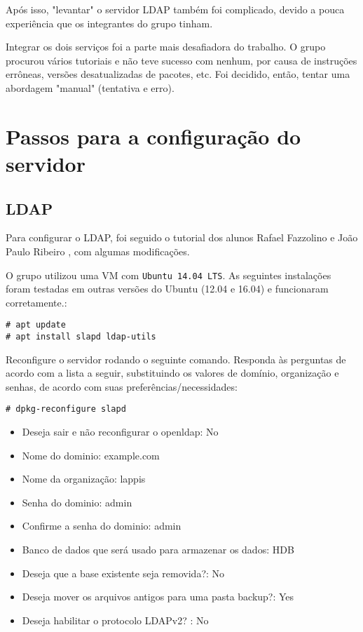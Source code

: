Após isso, "levantar" o servidor LDAP também foi complicado, devido a pouca
experiência que os integrantes do grupo tinham.


Integrar os dois serviços foi a parte mais desafiadora do trabalho. O grupo procurou
vários tutoriais e não teve sucesso com nenhum, por causa de instruções errôneas,
versões desatualizadas de pacotes, etc. Foi decidido, então, tentar uma abordagem
"manual" (tentativa e erro).

\section{Passos para a configuração do servidor}

\subsection{LDAP}
Para configurar o LDAP, foi seguido o tutorial dos alunos Rafael Fazzolino e João Paulo
Ribeiro \cite{wiki}, com algumas modificações.

O grupo utilizou uma VM com \verb|Ubuntu 14.04 LTS|. As seguintes instalações
foram testadas em outras versões do Ubuntu (12.04 e 16.04) e funcionaram corretamente.:
\begin{verbatim}
# apt update
# apt install slapd ldap-utils
\end{verbatim}

Reconfigure o servidor rodando o seguinte comando. Responda às perguntas de acordo
com a lista a seguir, substituindo os valores de domínio, organização e senhas, de
acordo com suas preferências/necessidades:

\begin{verbatim}
# dpkg-reconfigure slapd
\end{verbatim}

\begin{itemize}
    \item Deseja sair e não reconfigurar o openldap: No
    \item Nome do dominio: example.com
    \item Nome da organização: lappis
    \item Senha do dominio: admin
    \item Confirme a senha do dominio: admin
    \item Banco de dados que será usado para armazenar os dados: HDB
    \item Deseja que a base existente seja removida?: No
    \item Deseja mover os arquivos antigos para uma pasta backup?: Yes
    \item Deseja habilitar o protocolo LDAPv2? : No
\end{itemize}


